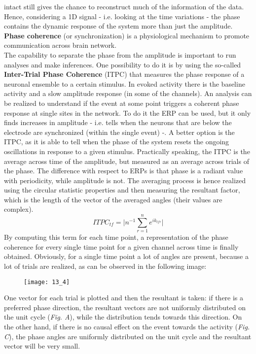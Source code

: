 intact still gives the chance to reconstruct much of the information of the data.\\
Hence, considering a 1D signal - i.e. looking at the time variations - the phase
contains the dynamic response of the system more than just the amplitude.
\textbf{Phase coherence} (or synchronization) is a physiological mechanism to promote
communication across brain network.\\
The capability to separate the phase from the amplitude is important to run analyses
and make inferences.
One possibility to do it is by using the so-called \textbf{Inter-Trial Phase Coherence}
(ITPC) that measures the phase response of a neuronal ensemble to a certain stimulus.
In evoked activity there is the baseline activity and a slow amplitude response (in
some of the channels). An analysis can be realized to understand if the event at some
point triggers a coherent phase response at single sites in the network.
To do it the ERP can be used, but it only finds increases in amplitude - i.e. tells
when the neurons that are below the electrode are synchronized (within the single
event) -. A better option is the ITPC, as it is able to tell when the phase of the
system resets the ongoing oscillations in response to a given stimulus.
Practically speaking, the ITPC is the average across time of the amplitude, but
measured as an average across trials of the phase. The difference with respect to ERPs
is that phase is a radiant value with periodicity, while amplitude is not.
The averaging process is hence realized using the circular statistic properties and
then measuring the resultant factor, which is the length of the vector of the
averaged angles (their values are complex).
\begin{equation*}
    ITPC_{tf}=\biggl|n^{-1}\sum_{r=1}^ne^{ik_{tfr}}\biggr|
\end{equation*}
By computing this term for each time point, a representation of the phase coherence
for every single time point for a given channel across time is finally obtained.
Obviously, for a single time point a lot of angles are present, because a lot of
trials are realized, as can be observed in the following image:
\begin{figure}[H]
    \centering
    \texttt{[image: 13\_4]}
\end{figure}
One vector for each trial is plotted and then the resultant is taken: if there is a
preferred phase direction, the resultant vectors are not uniformly distributed on the
unit cycle (\textit{Fig. A}), while the distribution tends towards this direction.
On the other hand, if there is no causal effect on the event towards the activity
(\textit{Fig. C}), the phase angles are uniformly distributed on the unit cycle and
the resultant vector will be very small.

